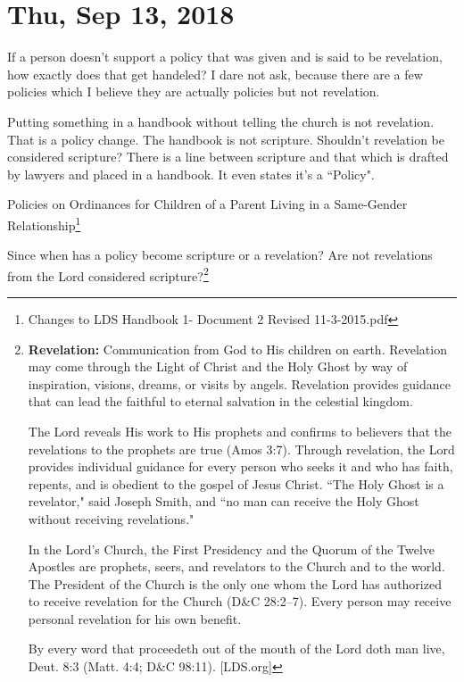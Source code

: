 \section{Thu, Sep 13, 2018}

If a person doesn't support a policy that was given and is said to be revelation, how
exactly does that get handeled? I dare not ask, because there are a few policies
which I believe they are actually policies but not revelation.

Putting something in a handbook without telling the church is not revelation. That is
a policy change. The handbook is not scripture. Shouldn't revelation be considered
scripture? There is a line between scripture and that which is drafted by lawyers and
placed in a handbook. It even states it's a ``Policy".

\begin{displayquote}
Policies on Ordinances for Children of a Parent Living in a Same-Gender
Relationship\footnote{Changes to LDS Handbook 1- Document 2 Revised 11-3-2015.pdf}
\end{displayquote}

Since when has a policy become scripture or a revelation? Are not revelations from
the Lord considered scripture?\footnote{\textbf{Revelation:} Communication from God 
to His children on earth. Revelation may come through the Light of Christ and the 
Holy Ghost by way of inspiration, visions, dreams, or visits by angels. Revelation 
provides guidance that can lead the faithful to eternal salvation in the celestial 
kingdom.

The Lord reveals His work to His prophets and confirms to believers that the 
revelations to the prophets are true (Amos 3:7). Through revelation, the Lord 
provides individual guidance for every person who seeks it and who has faith, 
repents, and is obedient to the gospel of Jesus Christ. ``The Holy Ghost is a 
revelator," said Joseph Smith, and ``no man can receive the Holy Ghost without 
receiving revelations."

In the Lord’s Church, the First Presidency and the Quorum of the Twelve Apostles are 
prophets, seers, and revelators to the Church and to the world. The President of the 
Church is the only one whom the Lord has authorized to receive revelation for the 
Church (D\&C 28:2–7). Every person may receive personal revelation for his own 
benefit.

By every word that proceedeth out of the mouth of the Lord doth man live, Deut. 8:3
(Matt. 4:4; D\&C 98:11). [LDS.org]}

